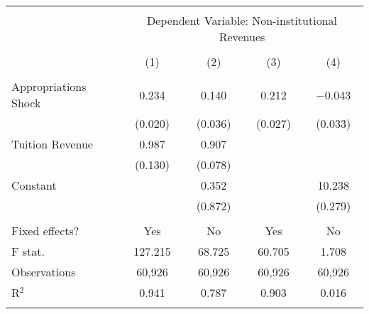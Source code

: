 
\begin{tabular}{@{\extracolsep{5pt}}lcccc} 
\\[-1.8ex]\hline 
\hline \\[-1.8ex] 
 & \multicolumn{4}{c}{Dependent Variable: Non-institutional Revenues} \\ 
\cline{2-5} 
\\[-1.8ex] & (1) & (2) & (3) & (4)\\ 
\hline \\[-1.8ex] 
 Appropriations Shock & 0.234 & 0.140 & 0.212 & $-$0.043 \\ 
  & (0.020) & (0.036) & (0.027) & (0.033) \\ 
  Tuition Revenue & 0.987 & 0.907 &  &  \\ 
  & (0.130) & (0.078) &  &  \\ 
  Constant &  & 0.352 &  & 10.238 \\ 
  &  & (0.872) &  & (0.279) \\ 
 \hline \\[-1.8ex] 
Fixed effects? & Yes & No & Yes & No \\ 
F stat. & 127.215 & 68.725 & 60.705 & 1.708 \\ 
Observations & 60,926 & 60,926 & 60,926 & 60,926 \\ 
R$^{2}$ & 0.941 & 0.787 & 0.903 & 0.016 \\ 
\hline 
\hline \\[-1.8ex] 
\end{tabular} 
